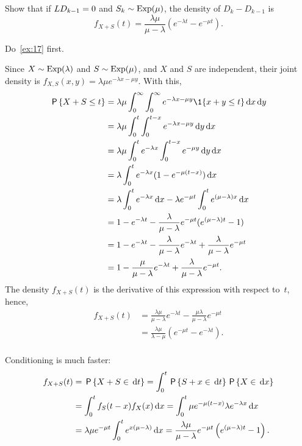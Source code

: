 \begin{exercise}\label{ex:46}
Show that if $L{D_{k-1}} = 0$ and $S_k \sim\mathrm{Exp}(\mu)$,  the density of $D_{k} - D_{k-1}$ is
 \begin{equation*}
 f_{X+S}(t) = \frac{\lambda \mu}{\mu-\lambda} (e^{-\lambda t} - e^{-\mu t}).
 \end{equation*}
\begin{hint}
  Do~\cref{ex:17} first.
\end{hint}
\begin{solution}
Since $X\sim \mathrm{Exp}(\lambda)$ and $S\sim\mathrm{Exp}(\mu)$, and $X$ and $S$ are independent, their joint density is $f_{X,S}(x,y) = \lambda \mu e^{-\lambda x - \mu y}$. With this,
 \begin{align*}
\P{X+S\leq t }
&= \lambda \mu \int_0^\infty \int_0^\infty e^{-\lambda x - \mu y} \1{x+y\leq t} \d x \d y \\
&= \lambda \mu \int_0^t \int_0^{t-x} e^{-\lambda x - \mu y} \d y \d x \\
&= \lambda \mu \int_0^t e^{-\lambda x} \int_0^{t-x} e^{- \mu y} \d y \d x \\
&= \lambda \int_0^t e^{-\lambda x} (1-e^{- \mu (t-x)} ) \d x \\
&= \lambda \int_0^t e^{-\lambda x} \d x - \lambda e^{-\mu t} \int_0^t e^{(\mu-\lambda) x} \d x \\
&= 1- e^{-\lambda t} - \frac{\lambda}{\mu-\lambda} e^{-\mu t} ( e^{(\mu-\lambda) t} -1) \\
&= 1- e^{-\lambda t} - \frac{\lambda}{\mu-\lambda} e^{-\lambda t} + \frac{\lambda}{\mu-\lambda} e^{-\mu t} \\
&= 1 - \frac{\mu}{\mu-\lambda} e^{-\lambda t} + \frac{\lambda}{\mu-\lambda} e^{-\mu t}. \\
 \end{align*}
The density $f_{X+S}(t)$ is the derivative of this expression with respect to~$t$, hence,
\begin{align*}
 f_{X+S}(t)
&= \frac{\lambda\mu}{\mu-\lambda} e^{-\lambda t} - \frac{\mu \lambda}{\mu-\lambda} e^{-\mu t} \\
&= \frac{\lambda\mu}{\lambda -\mu}(e^{-\mu t} - e^{-\lambda t}). \\
\end{align*}

Conditioning is much faster:
 \begin{align*}
 f_{X+S}(t)
&= \,\mathsf{P}\left\{X+S\in \,\textrm{d}t\right\}
= \int_0^t \,\mathsf{P}\left\{S+x\in \,\textrm{d}t\right\}\,\mathsf{P}\left\{X\in \,\textrm{d}x\right\} \\
&=\int_0^t f_S(t-x) f_X(x) \,\textrm{d}x
 = \int_0^t \mu e^{-\mu(t-x)} \lambda e^{-\lambda x} \,\textrm{d}x \\
 &= \lambda \mu e^{-\mu t} \int_0^t e^{x(\mu-\lambda)} \,\textrm{d}x = \frac{\lambda \mu}{\mu - \lambda}e^{-\mu t}\left(e^{(\mu -\lambda)t} - 1\right).
 \end{align*}
\end{solution}
\end{exercise}


